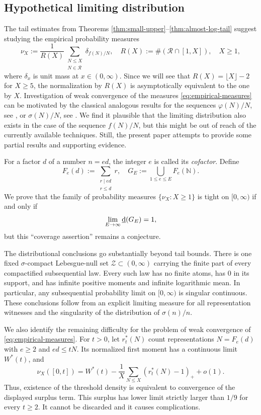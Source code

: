 \documentclass[11pt,letterpaper,reqno]{amsart}
\numberwithin{equation}{section}
\theoremstyle{remark}
\newcommand{\N}{\mathbb{N}}
\newcommand{\Rcal}{\mathcal{R}}
\newcommand{\1}{\mathbf 1}
\newcommand{\lowerdens}{\underline{\textup{d}}}
\renewcommand{\leq}{\leqslant}
\renewcommand{\geq}{\geqslant}
\begin{document}
\subsection{Hypothetical limiting distribution}

The tail estimates from Theorems \ref{thm:small-upper}--\ref{thm:almost-log-tail} suggest studying the empirical probability measures
\begin{equation}\label{eq:empirical-measures}
 \nu_X:=\frac1{R(X)}
 \sum_{\substack{N\leq X\\N\in\Rcal}}\delta_{f(N)/N},
 \quad R(X):=\#(\Rcal\cap[1,X]),\quad X\geq1,
\end{equation}
where $\delta_x$ is unit mass at $x\in(0,\infty)$.
Since we will see that $R(X)=\lfloor X\rfloor-2$ for $X\geq5$,
the normalization by $R(X)$ is asymptotically equivalent to the one by $X$.
Investigation of weak convergence of the measures \eqref{eq:empirical-measures} can be motivated by the classical analogous results for the sequences $\varphi(N)/N$, see \cite{Schoenberg}, or $\sigma(N)/N$, see \cite{Davenport}.
We find it plausible that the limiting distribution also exists in the case of the sequence $f(N)/N$, but this might be out of reach of the currently available techniques. Still, the present paper attempts to provide some partial results and supporting evidence.

For a factor $d$ of a number $n=ed$, the
integer $e$ is called its \emph{cofactor}. Define
\[
 F_e(d):=\sum_{\substack{r\mid ed\\r\leq d}}r,
 \quad G_E:=\bigcup_{1\leq e\leq E}F_e(\N).
\]
We prove that the family of probability measures $\{\nu_X:X\geq1\}$ is tight on $[0,\infty)$ if and
only if
\[
 \lim_{E\to\infty}\lowerdens(G_E)=1,
\]
but this ``coverage assertion'' remains a conjecture.

The distributional conclusions go substantially beyond tail bounds.
There is one fixed $\sigma$-compact Lebesgue-null set
$\mathcal{Z}\subset(0,\infty)$ carrying the finite part of every
compactified subsequential law. Every such law has no finite atoms,
has $0$ in its support, and has infinite positive moments and infinite
logarithmic mean. In particular, any subsequential probability limit on
$[0,\infty)$ is singular continuous. These conclusions follow from an
explicit limiting measure for all representation witnesses and the
singularity of the distribution of $\sigma(n)/n$.

We also identify the remaining difficulty for the problem of weak convergence of \eqref{eq:empirical-measures}. For $t>0$,
let $r_t^*(N)$ count representations $N=F_e(d)$ with $e\geq2$ and
$ed\leq tN$. Its normalized first moment has a continuous limit
$W^*(t)$, and
\[
 \nu_X([0,t])=W^*(t)-\frac1X\sum_{N\leq X}(r_t^*(N)-1)_++o(1).
\]
Thus, existence of the threshold density is equivalent to convergence of
the displayed surplus term. This surplus has lower limit strictly
larger than $1/9$ for every $t\geq2$. It cannot be discarded and it causes complications.
\end{document}
